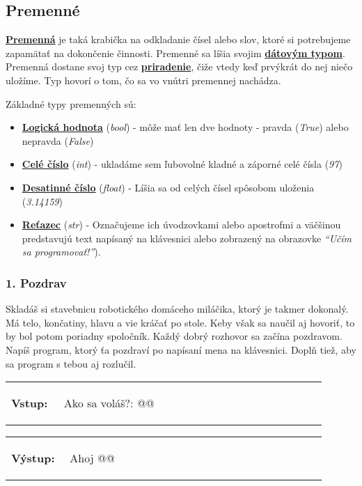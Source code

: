 \subsection{Premenné}
\underline{\textbf{Premenná}} je taká krabička na odkladanie čísel alebo slov, ktoré si potrebujeme zapamätať na dokončenie činnosti. Premenné sa líšia svojim \underline{\textbf{dátovým typom}}. Premenná dostane svoj typ cez \underline{\textbf{priradenie}}, čiže vtedy keď prvýkrát do nej niečo uložíme. Typ hovorí o tom, čo sa vo vnútri premennej nachádza.

Základné typy premenných sú:
\begin{itemize}[noitemsep,topsep=0pt]
\item \underline{\textbf{Logická hodnota}} (\textit{bool}) - môže mať len dve hodnoty - pravda (\textit{True}) alebo nepravda (\textit{False})
\item \underline{\textbf{Celé číslo}} (\textit{int}) - ukladáme sem ľubovolné kladné a záporné celé čísla (\textit{97})
\item \underline{\textbf{Desatinné číslo}} (\textit{float}) - Líšia sa od celých čísel spôsobom uloženia (\textit{3.14159})
\item \underline{\textbf{Reťazec}} (\textit{str}) - Označujeme ich úvodzovkami alebo apostrofmi a väčšinou predstavujú text napísaný na klávesnici alebo zobrazený na obrazovke \textit{``Učím sa programovať!''}).
\end{itemize}

\subsubsection*{1. Pozdrav}
Skladáš si stavebnicu robotického domáceho miláčika, ktorý je takmer dokonalý. Má telo, končatiny, hlavu a vie kráčať po stole. Keby však sa naučil aj hovoriť, to by bol potom poriadny spoločník. Každý dobrý rozhovor sa začína pozdravom. Napíš program, ktorý ťa pozdraví po napísaní mena na klávesnici. Doplň tiež, aby sa program s tebou aj rozlučil.

\begin{tabular}{@{}p{0.15\linewidth}p{0.75\linewidth}}
\textbf{\small Vstup:} &
\vspace{-3em}
\begin{code}
Ako sa voláš?: @\fbox{\phantom{meno}}@
\end{code}
\end{tabular}

\vspace{-2em}
\begin{tabular}{@{}p{0.15\linewidth}p{0.75\linewidth}}
\textbf{\small Výstup:} &
\vspace{-3em}
\begin{code} 
Ahoj @\fbox{\phantom{meno}}@
\end{code}
\end{tabular}
\vspace{-2em}

